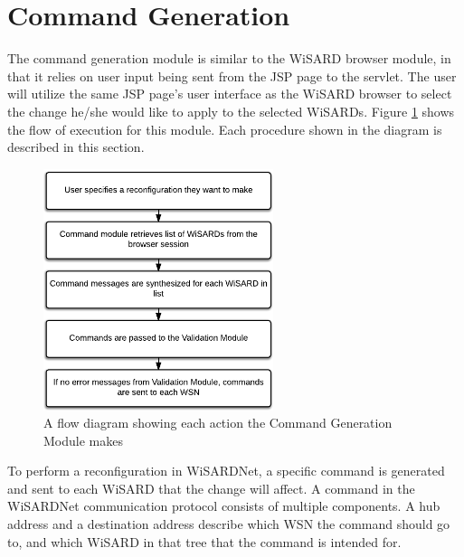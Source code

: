 \section{Command Generation}
The command generation module is similar to the WiSARD browser module, in that it relies on user input being sent from the JSP page to the servlet. The user will utilize the same JSP page's user interface as the WiSARD browser to select the change he/she would like to apply to the selected WiSARDs. Figure \ref{fig:flow_cmd_generator} shows the flow of execution for this module. Each procedure shown in the diagram is described in this section.\\

\begin{figure}[H]
	\centering
	\includegraphics[width=0.6\textwidth]{figures/flow_diagram_cmd_module.png}
	\caption{A flow diagram showing each action the Command Generation Module makes}
	\label{fig:flow_cmd_generator}
\end{figure}

To perform a reconfiguration in WiSARDNet, a specific command is generated and sent to each WiSARD that the change will affect. A command in the WiSARDNet communication protocol consists of multiple components. A hub address and a destination address describe which WSN the command should go to, and which WiSARD in that tree that the command is intended for.\\

